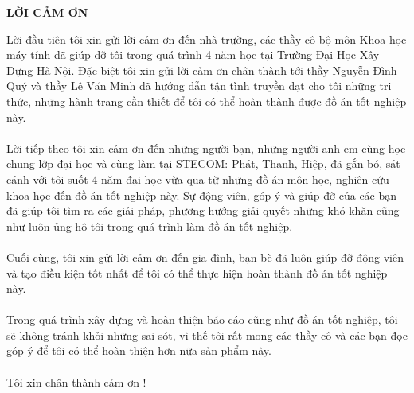 \documentclass[../main.tex]{subfiles}
\begin{document}
\begin{center}
    \Large{\textbf{LỜI CẢM ƠN}}\\
\end{center}
\vspace{1cm}
Lời đầu tiên tôi xin gửi lời cảm ơn đến nhà trường, các thầy cô bộ môn Khoa học máy tính đã giúp đỡ tôi trong quá trình 4 năm học tại Trường Đại Học Xây Dựng Hà Nội. Đặc biệt tôi xin gửi lời cảm ơn chân thành tới thầy Nguyễn Đình Quý và thầy Lê Văn Minh đã hướng dẫn tận tình truyền đạt cho tôi những tri thức, những hành trang cần thiết để tôi có thể hoàn thành được đồ án tốt nghiệp này.
\\
\\
Lời tiếp theo tôi xin cảm ơn đến những người bạn, những người anh em cùng học chung lớp đại học và cùng làm tại STECOM: Phát, Thanh, Hiệp, đã gắn bó, sát cánh với tôi suốt 4 năm đại học vừa qua từ những đồ án môn học, nghiên cứu khoa học đến đồ án tốt nghiệp này. Sự động viên, góp ý và giúp đỡ của các bạn đã giúp tôi tìm ra các giải pháp, phương hướng giải quyết những khó khăn cũng như luôn ủng hô tôi trong quá trình làm đồ án tốt nghiệp.
\\
\\
Cuối cùng, tôi xin gửi lời cảm ơn đến gia đình, bạn bè đã luôn giúp đỡ động viên và tạo điều kiện tốt nhất để tôi có thể thực hiện hoàn thành đồ án tốt nghiệp này.
\\
\\
Trong quá trình xây dựng và hoàn thiện báo cáo cũng như đồ án tốt nghiệp, tôi sẽ không tránh khỏi những sai sót, vì thế tôi rất mong các thầy cô và các bạn đọc góp ý để tôi có thể hoàn thiện hơn nữa sản phẩm này.
\\
\\
Tôi xin chân thành cảm ơn !
\end{document}
